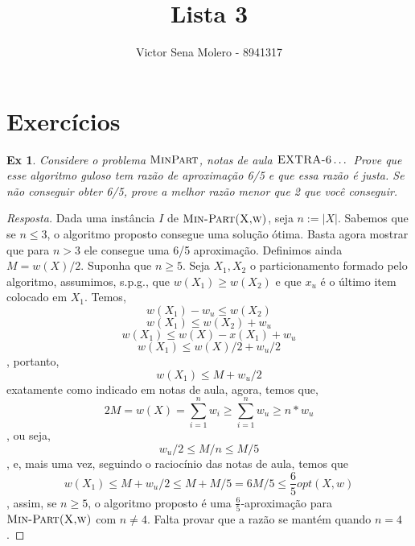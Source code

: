 \documentclass[12pt]{article}
\newcounter{exCounter}
\newtheorem{ex}[exCounter]{Ex}
\begin{document}
 
 
\title{Lista 3}
\author{Victor Sena Molero - 8941317}
\maketitle

\section{Exercícios}
\begin{ex}
Considere o problema $\textsc{MinPart}$, notas de aula $\textsc{EXTRA-6} \dots$   
Prove que esse algoritmo guloso tem razão de aproximação 6/5 e que essa razão é justa. Se não conseguir obter 6/5, prove a melhor razão menor que 2 que você conseguir.  
\end{ex}

\begin{proof}[Resposta]
Dada uma instância $I$ de $\textsc{Min-Part(X,w)}$, seja $n := |X|$. Sabemos que se $n \leq 3$, o algoritmo proposto consegue uma solução ótima. Basta agora mostrar que para $n > 3$ ele consegue uma 6/5 aproximação. Definimos ainda $M = w(X)/2$. Suponha que $n \geq 5$.  
Seja $X_1, X_2$ o particionamento formado pelo algoritmo, assumimos, s.p.g., que $w(X_1) \geq w(X_2)$ e que $x_u$ é o último item colocado em $X_1$. Temos,
$$ w(X_1)-w_u \leq w(X_2) $$
$$ w(X_1) \leq w(X_2) + w_u $$
$$ w(X_1) \leq w(X) - x(X_1) + w_u $$
$$ w(X_1) \leq w(X)/2 + w_u/2 $$, 
portanto,
$$ w(X_1) \leq M + w_u/2 $$
exatamente como indicado em notas de aula, agora, temos que,  
$$ 2M = w(X) = \sum \limits_{i=1}^n w_i \geq \sum \limits_{i=1}^n w_u \geq n*w_u $$,
ou seja,
$$ w_u/2 \leq M/n \leq M/5 $$,
e, mais uma vez, seguindo o raciocínio das notas de aula, temos que 
$$ w(X_1) \leq M + w_u/2 \leq M + M/5 = 6M/5 \leq \frac{6}{5}opt(X,w) $$, 
assim, se $n \geq 5$, o algoritmo proposto é uma $\frac{6}{5}$-aproximação para $\textsc{Min-Part(X,w)}$ com $n \neq 4$. Falta provar que a razão se mantém quando $n = 4$.
\end{proof}
\end{document}
